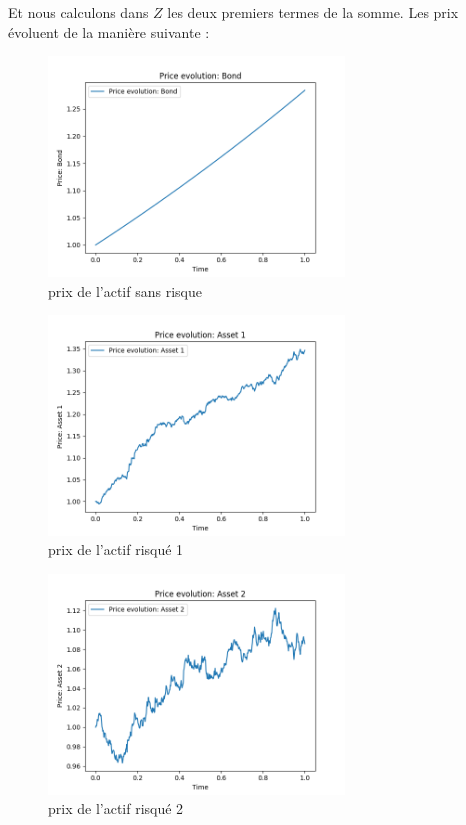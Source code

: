\documentclass[../finalreport.tex]{subfiles}
\begin{document}
\par Et nous calculons dans $Z$ les deux premiers termes de la somme. Les prix évoluent de la manière suivante :
\begin{figure}[H]
  \centering
    \includegraphics[width=0.7\textwidth]{images/simulation_2/price_0.png}
  \caption{prix de l'actif sans risque}
\end{figure}

\begin{figure}[H]
  \centering
    \includegraphics[width=0.7\textwidth]{images/simulation_2/price_1.png}
  \caption{prix de l'actif risqué 1}
\end{figure}

\begin{figure}[H]
  \centering
    \includegraphics[width=0.7\textwidth]{images/simulation_2/price_2.png}
  \caption{prix de l'actif risqué 2}
\end{figure}
\end{document}
